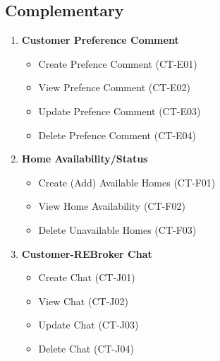 \documentclass[11pt]{article}
\begin{document}
		\subsection{Complementary}
			\begin{enumerate}[i]
				\item \textbf{Customer Preference Comment}
				\begin{itemize}
					\item Create Prefence Comment (CT-E01)
					\item View Prefence Comment (CT-E02)
					\item Update Prefence Comment (CT-E03)
					\item Delete Prefence Comment (CT-E04)
				\end{itemize}
				
				\item \textbf{Home Availability/Status}
				\begin{itemize}
					\item Create (Add) Available Homes (CT-F01)
					\item View Home Availability (CT-F02)
					\item Delete Unavailable Homes (CT-F03)
				\end{itemize}
				
				\item \textbf{Customer-REBroker Chat}
				\begin{itemize}
					\item Create Chat (CT-J01)
					\item View Chat (CT-J02)
					\item Update Chat (CT-J03)
					\item Delete Chat (CT-J04)
				\end{itemize}
			\end{enumerate}
	
\end{document}
